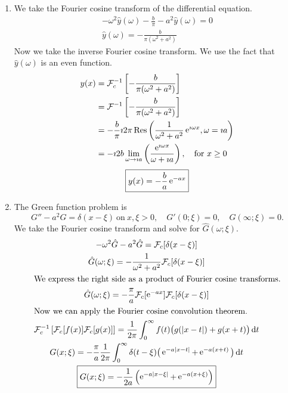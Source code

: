 {%
\begin{Solution}
  \label{solution ode ft fct y-a2y=0}
  \begin{enumerate}
  \item
    We take the Fourier cosine transform of the differential equation.
    \begin{gather*}
      - \omega^2 \hat{y}(\omega) - \frac{b}{\pi} - a^2 \hat{y}(\omega)= 0 
      \\
      \hat{y}(\omega) = - \frac{b}{\pi (\omega^2 + a^2)}
    \end{gather*}
    Now we take the inverse Fourier cosine transform.  We use the fact that
    $\hat{y}(\omega)$ is an even function.
    \begin{align*}
      y(x)    
      &= \mathcal{F}_c^{-1} \left[ -\frac{b}{\pi (\omega^2 + a^2)} \right] 
      \\
      &= \mathcal{F}^{-1} \left[ -\frac{b}{\pi (\omega^2 + a^2)} \right] 
      \\
      &= - \frac{b}{\pi} \imath 2 \pi \mathop{\mathrm{Res}}\nolimits \left( \frac{1}{\omega^2 + a^2}
        \mathop{\mathrm{e}}\nolimits^{\imath \omega x}, \omega = \imath a \right) 
      \\
      &= - \imath 2 b \lim_{\omega \to \imath a} \left( \frac{\mathop{\mathrm{e}}\nolimits^{\imath \omega x}}{\omega + \imath a} \right), 
      \quad \mathrm{for}\ x \geq 0
    \end{align*}
    \[
    \boxed{
      y(x) = - \frac{b}{a} \mathop{\mathrm{e}}\nolimits^{-a x}
      }
    \]
  \item
    The Green function problem is
    \[
    G'' - a^2 G = \delta(x - \xi)\ \mathrm{on}\ x,\xi > 0, 
    \quad G'(0; \xi) = 0, \quad G(\infty; \xi) = 0.
    \]
    We take the Fourier cosine transform and solve for $\hat{G}(\omega; \xi)$.
    \begin{gather*}
      - \omega^2 \hat{G} - a^2 \hat{G} = \mathcal{F}_c[\delta(x - \xi)] 
      \\
      \hat{G}(\omega; \xi) = - \frac{ 1 }{\omega^2 + a^2} \mathcal{F}_c[\delta(x - \xi)] 
      \\
      \intertext{We express the right side as a product of Fourier 
        cosine transforms.}
      \hat{G}(\omega; \xi) = - \frac{\pi}{a} \mathcal{F}_c[\mathop{\mathrm{e}}\nolimits^{- a x}] \mathcal{F}_c[\delta(x - \xi)] 
      \\
      \intertext{Now we can apply the Fourier cosine convolution theorem.}
      \mathcal{F}_c^{-1} \left[ \mathcal{F}_c[f(x)] \mathcal{F}_c[g(x)] \right]
      = \frac{1}{2 \pi} \int_0^\infty f(t) \big( g(|x - t|) + g(x + t) \big)\,\mathrm{d} t
      \\
      G(x; \xi) = - \frac{\pi}{a} \frac{1}{2\pi} \int_0^\infty \delta(t - \xi)
      \big( \mathop{\mathrm{e}}\nolimits^{- a |x - t|} + \mathop{\mathrm{e}}\nolimits^{- a (x + t)} \big) \,\mathrm{d} t 
      \\
      \boxed{
        G(x; \xi) = - \frac{1}{2 a} \left( \mathop{\mathrm{e}}\nolimits^{-a |x - \xi|} + \mathop{\mathrm{e}}\nolimits^{- a (x + \xi)} \right)
        }
    \end{gather*}
  \end{enumerate}
\end{Solution}







}
